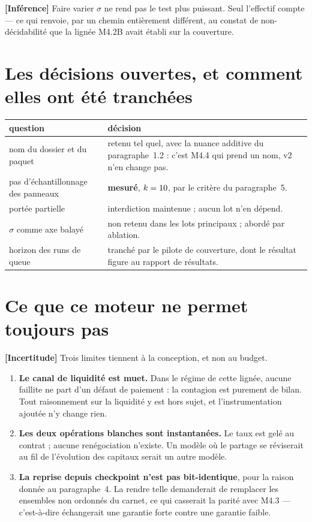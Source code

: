 \documentclass[11pt,a4paper]{article}
\newcommand{\inference}{\textbf{[Inférence]}}
\newcommand{\incertitude}{\textbf{[Incertitude]}}
\begin{document}
\inference{} Faire varier $\sigma$ ne rend pas le test plus puissant. Seul
l'effectif compte --- ce qui renvoie, par un chemin entièrement différent, au
constat de non-décidabilité que la lignée M4.2B avait établi sur la
couverture.

\section{Les décisions ouvertes, et comment elles ont été tranchées}

\begin{longtable}{@{}p{}p{}@{}}
\toprule
\textbf{question} & \textbf{décision} \\
\midrule
\endhead
nom du dossier et du paquet & retenu tel quel, avec la nuance additive du
paragraphe~1.2 : c'est M4.4 qui prend un nom, v2 n'en change pas. \\
\addlinespace
pas d'échantillonnage des panneaux & \textbf{mesuré}, $k = 10$,
par le critère du paragraphe~5. \\
\addlinespace
portée partielle & interdiction maintenue ; aucun lot n'en dépend. \\
\addlinespace
$\sigma$ comme axe balayé & non retenu dans les lots principaux ; abordé par
ablation. \\
\addlinespace
horizon des runs de queue & tranché par le pilote de couverture, dont le
résultat figure au rapport de résultats. \\
\bottomrule
\end{longtable}

\section{Ce que ce moteur ne permet toujours pas}

\incertitude{} Trois limites tiennent à la conception, et non au budget.

\begin{enumerate}
\item \textbf{Le canal de liquidité est muet.} Dans le régime de cette
      lignée, aucune faillite ne part d'un défaut de paiement : la contagion
      est purement de bilan. Tout raisonnement sur la liquidité y est hors
      sujet, et l'instrumentation ajoutée n'y change rien.
\item \textbf{Les deux opérations blanches sont instantanées.} Le taux est
      gelé au contrat ; aucune renégociation n'existe. Un modèle où le
      partage se réviserait au fil de l'évolution des capitaux serait un
      autre modèle.
\item \textbf{La reprise depuis checkpoint n'est pas bit-identique}, pour la
      raison donnée au paragraphe~4. La rendre telle demanderait de remplacer
      les ensembles non ordonnés du carnet, ce qui casserait la parité avec
      M4.3 --- c'est-à-dire échangerait une garantie forte contre une
      garantie faible.
\end{enumerate}
\end{document}
